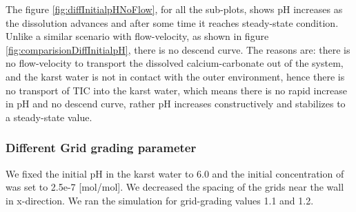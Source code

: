 The figure \ref{fig:diffInitialpHNoFlow}, for all the sub-plots, shows pH increases as the dissolution advances and after some time it reaches steady-state condition. Unlike a similar scenario with flow-velocity, as shown in figure \ref{fig:comparisionDiffInitialpH}, there is no descend curve. The reasons are: there is no flow-velocity to transport the dissolved calcium-carbonate out of the system, and the karst water is not in contact with the outer environment, hence there is no transport of TIC into the karst water, which means there is no rapid increase in pH and no descend curve, rather pH increases constructively and stabilizes to a steady-state value.


\subsubsection*{Different Grid grading parameter} \label{ssec:diffGridnoflow}
We fixed the initial pH in the karst water to 6.0 and the initial concentration of   was set to 2.5e-7 [mol/mol]. We decreased the spacing of the grids near the wall in x-direction. We ran the simulation for grid-grading values 1.1 and 1.2. 

